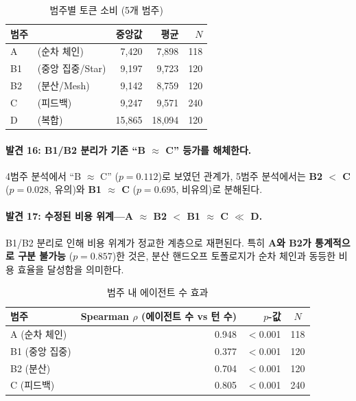 \documentclass[a4paper,11pt]{article}
\begin{document}
\begin{table}[H]
\centering
\caption{범주별 토큰 소비 (5개 범주)}
\label{tab:cat-token-summary}
{\small
\begin{tabular}{llrrr}
\toprule
범주 & & 중앙값 & 평균 & $N$ \\
\midrule
A  & (순차 체인)    & 7,420  & 7,898  & 118 \\
B1 & (중앙 집중/Star) & 9,197  & 9,723  & 120 \\
B2 & (분산/Mesh)     & 9,142  & 8,759  & 120 \\
C  & (피드백)        & 9,247  & 9,571  & 240 \\
D  & (복합)          & 15,865 & 18,094 & 120 \\
\bottomrule
\end{tabular}
}
\end{table}

\paragraph{발견 16: B1/B2 분리가 기존 ``B $\approx$ C'' 등가를 해체한다.}
4범주 분석에서 ``B $\approx$ C'' ($p=0.112$)로 보였던 관계가, 5범주 분석에서는 \textbf{B2 $<$ C} ($p=0.028$, 유의)와 \textbf{B1 $\approx$ C} ($p=0.695$, 비유의)로 분해된다.

\paragraph{발견 17: 수정된 비용 위계---A $\approx$ B2 $<$ B1 $\approx$ C $\ll$ D.}
B1/B2 분리로 인해 비용 위계가 정교한 계층으로 재편된다. 특히 \textbf{A와 B2가 통계적으로 구분 불가능} ($p=0.857$)한 것은, 분산 핸드오프 토폴로지가 순차 체인과 동등한 비용 효율을 달성함을 의미한다.

\begin{table}[H]
\centering
\caption{범주 내 에이전트 수 효과}
\label{tab:spearman-agents}
{\small
\begin{tabular}{lrrc}
\toprule
범주 & Spearman $\rho$ (에이전트 수 vs 턴 수) & $p$-값 & $N$ \\
\midrule
A (순차 체인)  & 0.948 & $<$0.001 & 118 \\
B1 (중앙 집중) & 0.377 & $<$0.001 & 120 \\
B2 (분산)      & 0.704 & $<$0.001 & 120 \\
C (피드백)     & 0.805 & $<$0.001 & 240 \\
\bottomrule
\end{tabular}
}
\end{table}
\end{document}
